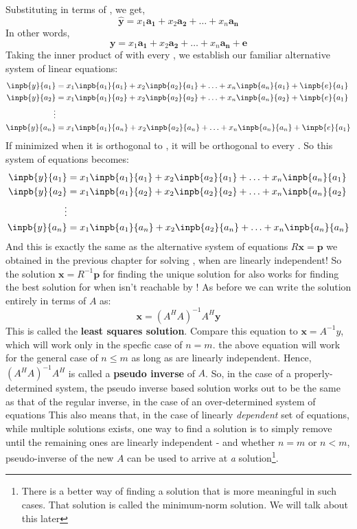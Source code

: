 Substituting  in terms of , we get,
	\[ \hat{\mathbf{y}} = x_1\mathbf{a_1} + x_2\mathbf{a_2} + \ldots + x_n\mathbf{a_n} \]
In other words,
	\[ \mathbf{y} = x_1\mathbf{a_1} + x_2\mathbf{a_2} + \ldots + x_n\mathbf{a_n} + \mathbf{e} \]
Taking the inner product of  with every , we establish our familiar alternative system of linear equations:
	\begin{align*}
	\inpb{y}{a_1} &= x_1\inpb{a_1}{a_1} + x_2\inpb{a_2}{a_1} + \ldots + x_n\inpb{a_n}{a_1} + \inpb{e}{a_1}\\ 
	\inpb{y}{a_2} &= x_1\inpb{a_1}{a_2} + x_2\inpb{a_2}{a_2} + \ldots + x_n\inpb{a_n}{a_2} + \inpb{e}{a_1}\\
	\vdots \\
	\inpb{y}{a_n} &= x_1\inpb{a_1}{a_n} + x_2\inpb{a_2}{a_n} + \ldots + x_n\inpb{a_n}{a_n} + \inpb{e}{a_1}\\
	\end{align*}
If  minimized when it is orthogonal to , it will be orthogonal to every . So this system of equations becomes:
	\begin{align*}
	\inpb{y}{a_1} &= x_1\inpb{a_1}{a_1} + x_2\inpb{a_2}{a_1} + \ldots + x_n\inpb{a_n}{a_1} \\ 
	\inpb{y}{a_2} &= x_1\inpb{a_1}{a_2} + x_2\inpb{a_2}{a_2} + \ldots + x_n\inpb{a_n}{a_2} \\
	\vdots \\
	\inpb{y}{a_n} &= x_1\inpb{a_1}{a_n} + x_2\inpb{a_2}{a_n} + \ldots + x_n\inpb{a_n}{a_n} \\
	\end{align*}
And this is exactly the same as the alternative system of equations \( R\mathbf{x} = \mathbf{p} \) we obtained in the previous chapter for solving , when  are linearly independent! So the solution \(\mathbf{x} = R^{-1}\mathbf{p}\) for finding the unique solution for  also works for finding the best solution for  when  isn't reachable by ! As before we can write the solution entirely in terms of \(A\) as:
	\[ \mathbf{x} = (A^H A)^{-1} A^H \mathbf{y} \]
This is called the \textbf{least squares solution}. Compare this equation to \(\mathbf{x} = A^{-1}y\), which will work only in the specfic case of \(n = m\). the above equation will work for the general case of \(n \leq m\) as long as  are linearly independent. Hence, \((A^H A)^{-1} A^H\) is called a \textbf{pseudo inverse} of \(A\). So, in the case of a properly-determined system, the pseudo inverse based solution works out to be the same as that of the regular inverse, in the case of an over-determined system of equations This also means that, in the case of linearly \emph{dependent} set of equations, while multiple solutions exists, one way to find a solution is to simply remove  until the remaining ones are linearly independent - and whether \(n = m\) or \(n < m\), pseudo-inverse of the new \(A\) can be used to arrive at \emph{a} solution\footnote{There is a better way of finding a solution that is more meaningful in such cases. That solution is called the minimum-norm solution. We will talk about this later}.

